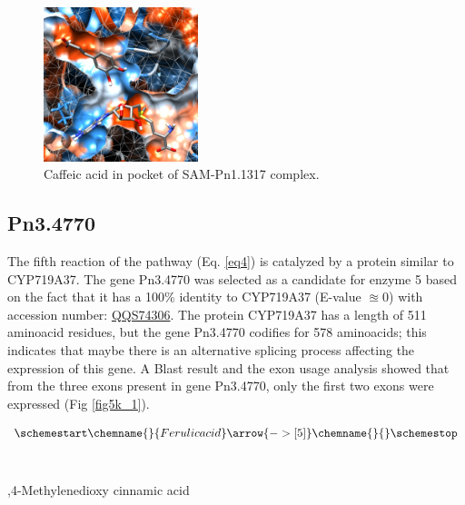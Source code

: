 \documentclass[12pt]{article}
\begin{document}
	\FloatBarrier
	
	\FloatBarrier
	\begin{figure}[h!]
		\centering
		\includegraphics[width=0.4\textwidth]{../4/Dock/Dock2/chimera.png}
		\caption{\centering Caffeic acid in pocket of SAM-Pn1.1317 complex.}
		\label{fig4_10}
	\end{figure}
	\FloatBarrier
	
	\newpage
	
	\subsection{Pn3.4770}
	
	The fifth reaction of the pathway (Eq. \ref{eq4}) is catalyzed by a protein similar to CYP719A37. The gene Pn3.4770 was selected as a candidate for enzyme 5 based on the fact that it has a 100\% identity to CYP719A37 (E-value $\approxeq 0$) with accession number: \href{https://www.ncbi.nlm.nih.gov/protein/QQS74306.1/}{QQS74306}. The protein CYP719A37 has a length of 511 aminoacid residues, but the gene Pn3.4770 codifies for 578 aminoacids; this indicates that maybe there is an alternative splicing process affecting the expression of this gene. A Blast result and the exon usage analysis showed that from the three exons present in gene Pn3.4770, only the first two exons were expressed (Fig \ref{fig5k_1}).
	
	\begin{equation}
	\schemestart
	\chemname{\footnotesize}{Ferulic acid}\arrow{->[ 5]}\chemname{\footnotesize}{\vspace{-100pt}}
	\label{eq4}
	\schemestop
	\end{equation}\\
	
	\vspace{-50pt}\hspace{0.5\paperwidth-20pt}
	\begin{minipage}{0.3\paperwidth}
		,4-Methylenedioxy cinnamic acid
	\end{minipage}\\
	
\end{document}

